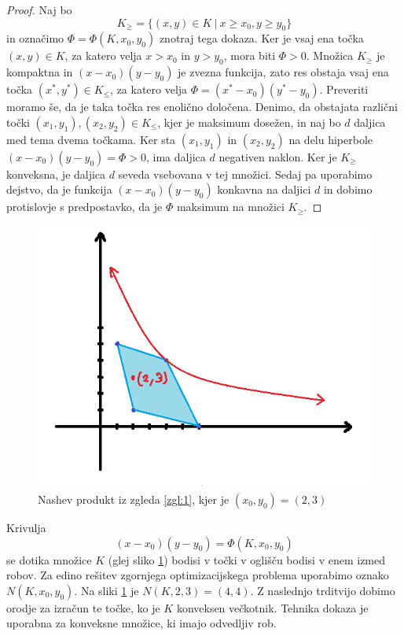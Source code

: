 \documentclass[10pt, a4paper]{article}
\newenvironment{noticeC}{%
  \tcolorbox[%
  notitle,
  empty,
  enhanced,  %
  breakable,
  coltext=black, 
  fontupper=\rmfamily,
  noparskip,
  sharp corners,
  boxrule=-1pt,  %
  frame hidden,
  left=7pt,  %
  right=7pt,
  top=5pt,
  bottom=5pt,
  before skip=2.5ex plus 2pt,
  after skip=2.5ex plus 2pt,
  overlay unbroken and last={%
  },
  ]}
{\endtcolorbox}
\newenvironment{dokaz}%
  {\begin{noticeC}\begin{proof}}%
  {\end{proof}\end{noticeC}}
\begin{document}
\begin{dokaz}
  Naj bo $$K_{\geq} = \{(x, y) \in K\ |\ x \geq x_0, y \geq y_0\}$$
  in označimo $\Phi = \Phi(K, x_0, y_0)$ znotraj tega dokaza.
  Ker je vsaj ena točka $(x, y) \in K$, za katero velja $x > x_0$ in $y > y_0$, mora biti $\Phi > 0$.
  Množica $K_{\geq}$ je kompaktna in $(x - x_0) (y - y_0)$ je zvezna funkcija, zato res obstaja vsaj ena točka 
  $(x^*, y^*) \in K_{\leq}$, za katero velja $\Phi = (x^* - x_0)(y^* - y_0)$.
  Preveriti moramo še, da je taka točka res enolično določena.
  Denimo, da obstajata različni točki $(x_1, y_1),(x_2, y_2) \in K_{\leq}$,
  kjer je maksimum dosežen, in naj bo $d$ daljica med tema dvema točkama.
  Ker sta $(x_1, y_1)$ in $(x_2, y_2)$ na delu hiperbole $(x - x_0)(y - y_0) = \Phi > 0$,
  ima daljica $d$ negativen naklon. Ker je $K_{\geq}$ konveksna, je daljica $d$ 
  seveda vsebovana v tej množici. Sedaj pa uporabimo dejstvo, da je funkcija 
  $(x - x_0) (y - y_0)$ konkavna na daljici $d$ in dobimo protislovje s predpostavko, da je $\Phi$
  maksimum na množici $K_{\geq}$.
\end{dokaz}

\begin{figure}
  \centering
  \includegraphics{images/slika5.png}
  \caption{Nashev produkt iz zgleda \ref{zgl:1}, kjer je $(x_0, y_0) = (2, 3)$}
  \label{fig:1}
\end{figure}

Krivulja $$(x - x_0)(y - y_0) = \Phi(K, x_0, y_0)$$
se dotika množice $K$ (glej sliko \ref{fig:1}) bodisi v točki v oglišču bodisi v enem izmed robov.
Za edino rešitev zgornjega optimizacijskega problema uporabimo oznako $N(K, x_0, y_0)$.
Na sliki \ref{fig:1} je $N(K, 2, 3) = (4, 4)$. Z naslednjo trditvijo dobimo orodje za izračun te točke,
ko je $K$ konveksen večkotnik. Tehnika dokaza je uporabna za konveksne množice, ki imajo odvedljiv rob.
\end{document}
